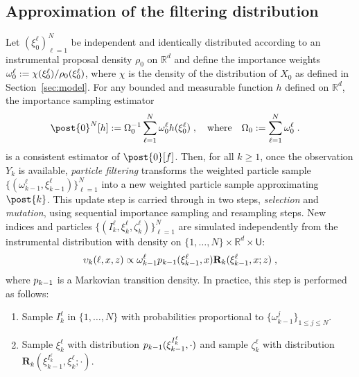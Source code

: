\documentclass{article}
\newcommand{\N}{N}
\newcommand{\kissforward}[3][]
{\ifthenelse{\equal{#1}{}}{p_{#2}}
{\ifthenelse{\equal{#1}{fully}}{p^{\star}_{#2}}
{\ifthenelse{\equal{#1}{smooth}}{\tilde{r}_{#2}}{\mathrm{erreur}}}}}
\newcommand{\instrpostaux}[1]{\ensuremath{\upsilon_{#1}}}
\newcommand{\XinitIS}[2][]
{\ifthenelse{\equal{#1}{}}{\ensuremath{\rho_{#2}}}{\ensuremath{\check{\rho}_{#2}}}}
\newcommand{\adjfuncforward}[1]{\vartheta_{#1}}
\newcommand{\eqdef}{\ensuremath{:=}}
\newcommand{\eqsp}{\;}
\newcommand{\ewght}[2]{\ensuremath{\omega_{#1}^{#2}}}
\newcommand{\epart}[2]{\ensuremath{\xi_{#1}^{#2}}}
\newcommand{\Xinit}{\ensuremath{\chi}}
\newcommand{\sumwght}[2][]{%
\ifthenelse{\equal{#1}{}}{\ensuremath{\Omega_{#2}}}{\ensuremath{\Omega_{#2}^{(#1)}}}}
\newcommand{\marginalset}{\mathsf{U}}
\newcommand{\kernelmarg}{\mathbf{R}}
\begin{document}
\subsection{Approximation of the filtering distribution}
\label{sec:filtering}
Let $(\epart{0}{\ell})_{\ell = 1}^\N$ be independent and identically distributed according to an instrumental proposal density $\rho_0$ on $\mathbb{R}^d$ and define the importance weights $\ewght{0}{\ell} \eqdef \Xinit(\epart{0}{\ell})/\XinitIS{0}(\epart{0}{\ell})$, where $\chi$ is the density of the distribution of $X_0$ as defined in Section~\ref{sec:model}. 
For any bounded and measurable function  $h$ defined on $\mathbb{R}^d$, the importance sampling estimator
\begin{align*}
\post{0}^\N[h]&\eqdef \sumwght{0}^{-1}\sum_{\ell=1}^\N \ewght{0}{\ell}h(\epart{0}{\ell})\eqsp,\quad\mbox{where}\quad\sumwght{0}\eqdef \sum_{\ell=1}^N \ewght{0}{\ell}\eqsp.
\end{align*}
is a consistent estimator of $\post{0}[f]$. 
Then, for all $k\geqslant 1$, once the observation $Y_k$ is available, \textit{particle filtering} transforms the weighted particle sample $\{(\ewght{k-1}{\ell},\epart{k-1}{\ell})\}_{\ell=1}^{\N}$ into a new weighted particle sample approximating $\post{k}$.
 This update step is carried through in two steps, \emph{selection} and \emph{mutation},  using sequential importance sampling and resampling steps.   
 New indices and particles $\{ (I_k^{\ell}, \epart{k}{\ell},\zeta_k^{\ell}) \}_{\ell = 1}^\N$ are simulated independently from the instrumental distribution with density on $\{1, \dots, \N\} \times \mathbb{R}^d\times \marginalset$:
$$
\instrpostaux{k}(\ell,x,z) \propto \ewght{k-1}{\ell} 
\kissforward{k-1}{k-1}(\epart{k-1}{\ell},x) \kernelmarg_{k}(\epart{k-1}{\ell},x;z) \eqsp,
$$
where 
$\kissforward{k-1}{k-1}$ is a Markovian transition density.  In practice, this step is performed as follows:
\begin{enumerate}
\item Sample $I_k^{\ell}$ in $\{1,\ldots,N\}$ with probabilities proportional to $\{\ewght{k-1}{j}
\}_{1\leqslant j\leqslant \N}$.
\item Sample $\epart{k}{\ell}$ with distribution $\kissforward{k-1}{k-1}(\epart{k-1}{I_k^{\ell}},\cdot)$ and sample $\zeta_k^{\ell}$ with distribution $\kernelmarg_{k}(\epart{k-1}{I_k^{\ell}},\epart{k}{\ell};\cdot)$.
\end{enumerate}
\end{document}
